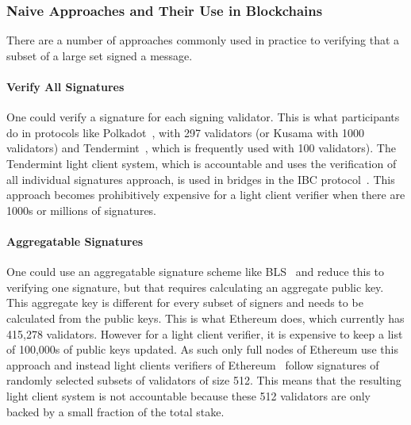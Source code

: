 \subsubsection{Naive Approaches and Their Use in Blockchains}
There are a number of approaches commonly used in practice to verifying that a subset of a large set signed a message.
\vspace{-0.2cm}
\noindent \paragraph{Verify All Signatures}  One could verify a signature for each signing validator. This is what participants  do in protocols like Polkadot~\cite{polkadot}, with 297 validators
(or Kusama with 1000 validators) %
and Tendermint~\cite{tendermint_paper}, which is frequently used with 100 validators). %
The Tendermint light client system, which is accountable and uses the verification of all individual signatures approach,
is used in bridges in the IBC protocol~\cite{IBC_paper}. This approach becomes prohibitively expensive for a light client verifier when there are 1000s or millions of signatures.
\vspace{-0.1in}
\noindent \paragraph{Aggregatable Signatures} One could use an aggregatable signature scheme like BLS~\cite{BLS_signatures,boneh_compact_multisig}  and reduce this to verifying one signature, but that requires calculating an aggregate public key. This aggregate key is different for every subset of signers and needs to be calculated from the public keys. This is what Ethereum
does, which currently has 415,278 validators. %
However for a light client verifier, it is expensive to keep a list of 100,000s of public keys updated. As such only full nodes of Ethereum use this approach and instead light clients verifiers of Ethereum~\cite{sync_committee} follow signatures of randomly selected subsets of validators of size 512. This means that the resulting light client system is not accountable because these 512 validators are only backed by a small fraction of the total stake.
\vspace{-0.2cm}
